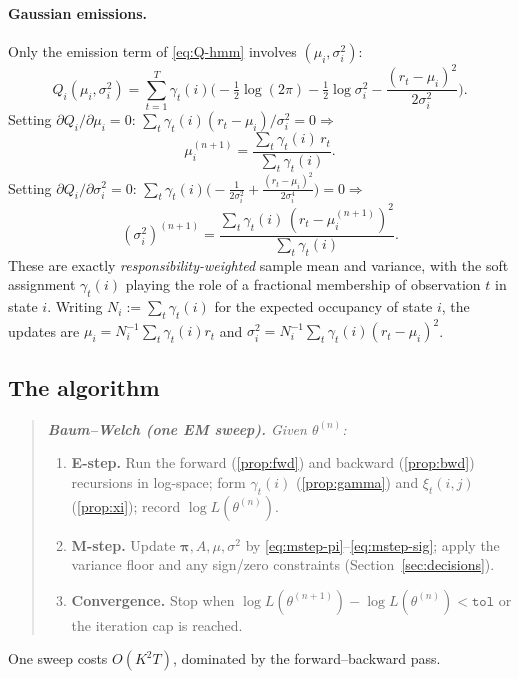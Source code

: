 \documentclass[11pt]{article}
\newcommand{\eqdef}{:=}
\newcommand{\obs}{r}
\newcommand{\nstate}{K}
\theoremstyle{plain}
\theoremstyle{definition}
\theoremstyle{remark}
\begin{document}
\paragraph{Gaussian emissions.}
Only the emission term of \eqref{eq:Q-hmm} involves $(\mu_i,\sigma_i^2)$:
\[
  Q_i(\mu_i,\sigma_i^2)
  = \sum_{t=1}^{T}\gamma_t(i)\Big(-\tfrac12\log(2\pi)
    -\tfrac12\log\sigma_i^2 - \frac{(\obs_t-\mu_i)^2}{2\sigma_i^2}\Big).
\]
Setting $\partial Q_i/\partial\mu_i=0$:
$\sum_t\gamma_t(i)(\obs_t-\mu_i)/\sigma_i^2=0\Rightarrow$
\begin{equation}\label{eq:mstep-mu}
  \boxed{\;\mu_i^{(n+1)} = \frac{\sum_{t}\gamma_t(i)\,\obs_t}{\sum_{t}\gamma_t(i)}.\;}
\end{equation}
Setting $\partial Q_i/\partial\sigma_i^2=0$:
$\sum_t\gamma_t(i)\big(-\tfrac{1}{2\sigma_i^2}+\tfrac{(\obs_t-\mu_i)^2}{2\sigma_i^4}\big)=0\Rightarrow$
\begin{equation}\label{eq:mstep-sig}
  \boxed{\;(\sigma_i^2)^{(n+1)}
  = \frac{\sum_{t}\gamma_t(i)\,(\obs_t-\mu_i^{(n+1)})^2}{\sum_{t}\gamma_t(i)}.\;}
\end{equation}
These are exactly \emph{responsibility-weighted} sample mean and variance, with
the soft assignment $\gamma_t(i)$ playing the role of a fractional membership of
observation $t$ in state $i$. Writing $N_i\eqdef\sum_t\gamma_t(i)$ for the
expected occupancy of state $i$, the updates are
$\mu_i=N_i^{-1}\sum_t\gamma_t(i)\obs_t$ and
$\sigma_i^2=N_i^{-1}\sum_t\gamma_t(i)(\obs_t-\mu_i)^2$.

\subsection{The algorithm}

\begin{quote}\itshape
\textbf{Baum--Welch (one EM sweep).} Given $\theta^{(n)}$:
\begin{enumerate}[label=\arabic*.,leftmargin=2em]
  \item \textbf{E-step.} Run the forward (\ref{prop:fwd}) and backward
        (\ref{prop:bwd}) recursions in log-space; form $\gamma_t(i)$
        (\ref{prop:gamma}) and $\xi_t(i,j)$ (\ref{prop:xi}); record
        $\log L(\theta^{(n)})$.
  \item \textbf{M-step.} Update $\bm\pi,A,\mu,\sigma^2$ by
        \eqref{eq:mstep-pi}--\eqref{eq:mstep-sig}; apply the variance floor and
        any sign/zero constraints (Section~\ref{sec:decisions}).
  \item \textbf{Convergence.} Stop when
        $\log L(\theta^{(n+1)})-\log L(\theta^{(n)}) < \texttt{tol}$ or the
        iteration cap is reached.
\end{enumerate}
\end{quote}
One sweep costs $O(\nstate^2 T)$, dominated by the forward--backward pass.
\end{document}
